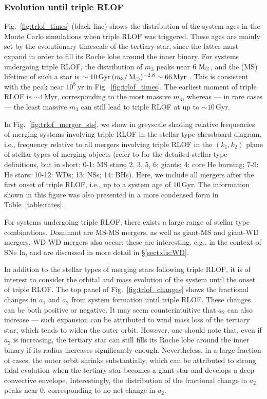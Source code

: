 \documentclass[twocolumn,appendixfloats,tighten]{aastex631}
\def\msun{{\rm\,M_\odot}}
\newcommand{\F}{Fig.}
\newcommand{\myr}{\mathrm{Myr}}
\newcommand{\yr}{\mathrm{yr}}
\newcommand{\gyr}{\mathrm{Gyr}}
\begin{document}
\subsubsection{Evolution until triple RLOF}
\label{sect:popsyn:trlof:ev}
\F~\ref{fig:trlof_times} (black line) shows the distribution of the system ages in the Monte Carlo simulations when triple RLOF was triggered. These ages are mainly set by the evolutionary timescale of the tertiary star, since the latter must expand in order to fill its Roche lobe around the inner binary. For systems undergoing triple RLOF, the distribution of $m_3$ peaks near $6\,\msun$, and the (MS) lifetime of such a star is $\sim 10\,\gyr\,(m_3/\msun)^{-2.8} \sim 66\,\myr$ \citep[e.g.,][]{1994sse..book.....K}. This is consistent with the peak near $10^8\,\yr$ in \F~\ref{fig:trlof_times}. The earliest moment of triple RLOF is $\sim 4 \, \myr$, corresponding to the most massive $m_3$, whereas --- in rare cases --- the least massive $m_3$ can still lead to triple RLOF at up to $\sim 10\,\gyr$. 

In \F~\ref{fig:trlof_merger_sts}, we show in greyscale shading relative frequencies of merging systems involving triple RLOF in the stellar type chessboard diagram, i.e., frequency relative to all mergers involving triple RLOF in the $(k_1,k_2)$ plane of stellar types of merging objects (refer to \citealt{2000MNRAS.315..543H} for the detailed stellar type definitions, but in short: 0-1: MS stars; 2, 3, 5, 6: giants; 4: core He burning; 7-9: He stars; 10-12: WDs; 13: NSs; 14: BHs). Here, we include all mergers after the first onset of triple RLOF, i.e., up to a system age of $10 \, \gyr$. The information shown in this figure was also presented in a more condensed form in Table~\ref{table:rates}. 

For systems undergoing triple RLOF, there exists a large range of stellar type combinations. Dominant are MS-MS mergers, as well as giant-MS and giant-WD mergers. WD-WD mergers also occur; these are interesting, e.g., in the context of SNe Ia, and are discussed in more detail in \S\ref{sect:dis:WD}.

In addition to the stellar types of merging stars following triple RLOF, it is of interest to consider the orbital and mass evolution of the system until the onset of triple RLOF. The top panel of \F~\ref{fig:trlof_changes} shows the fractional changes in $a_1$ and $a_2$ from system formation until triple RLOF. These changes can be both positive or negative. It may seem counterintuitive that $a_2$ can also increase --- such expansion can be attributed to wind mass loss of the tertiary star, which tends to widen the outer orbit. However, one should note that, even if $a_2$ is increasing, the tertiary star can still fills its Roche lobe around the inner binary if its radius increases significantly enough. Nevertheless, in a large fraction of cases, the outer orbit shrinks substantially, which can be attributed to strong tidal evolution when the tertiary star becomes a giant star and develops a deep convective envelope. Interestingly, the distribution of the fractional change in $a_2$ peaks near 0, corresponding to no net change in $a_2$.
\end{document}
